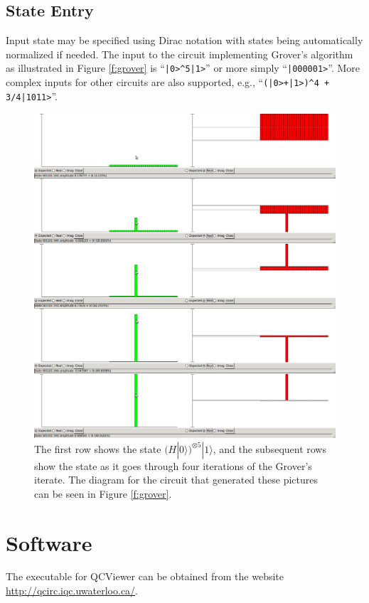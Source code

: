 \documentclass[aps,prl,reprint,floatfix,superscriptaddress]{revtex4-1} %
\begin{document}
\subsection{State Entry}
Input state may be specified using Dirac notation with states being automatically normalized if needed. The input to the circuit implementing Grover's algorithm as illustrated in Figure \ref{f:grover} is ``\verb$|0>^5|1>$'' or more simply 
``\verb$|000001>$''. More complex inputs for other circuits are also supported, e.g., ``\verb$(|0>+|1>)^4 + 3/4|1011>$''.
\begin{figure}[ht]
\includegraphics[scale=0.35]{simulate}
\caption{The first row shows the state $(H|0\rangle)^{\otimes 5}|1\rangle$, and the subsequent rows show the state as it goes through four iterations of the Grover's iterate. The
diagram for the circuit that generated these pictures can be seen in Figure \ref{f:grover}.}

\label{f:state}
\end{figure}

\section{Software}
The executable for QCViewer can be obtained from the website \url{http://qcirc.iqc.uwaterloo.ca/}.
\end{document}
